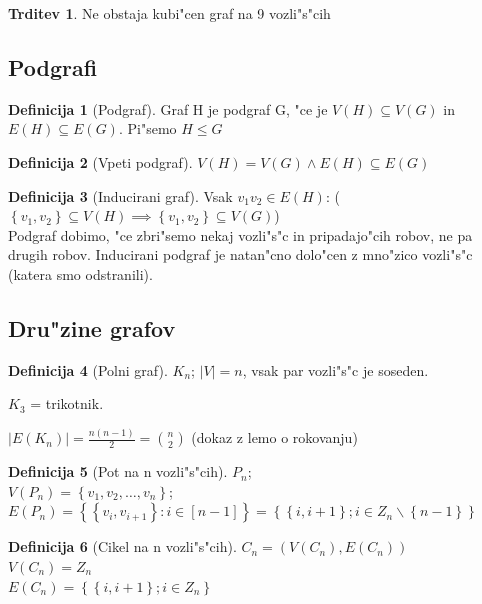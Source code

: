 \documentclass{article}
\theoremstyle{definition}
\newtheorem{definition}{Definicija}[section]
\newtheorem{claim}{Trditev}[section]
\begin{document}
	\begin{claim} 
		Ne obstaja kubi"cen graf na 9 vozli"s"cih
	\end{claim}
	
	
	\subsection{Podgrafi}
	\begin{definition}[Podgraf]
		Graf H je podgraf G, "ce je $V(H) \subseteq V(G)$ in $E(H) \subseteq E(G)$. Pi"semo $H \leq G$
	\end{definition}
	\begin{definition}[Vpeti podgraf]
		$V(H) = V(G) \land E(H) \subseteq E(G)$
	\end{definition}
	\begin{definition}[Inducirani graf]
		Vsak $v_1v_2 \in E(H)$: ($\left\lbrace v_1,v_2\right\rbrace \subseteq V(H) \implies \left\lbrace v_1,v_2\right\rbrace \subseteq V(G)$)
		\\
		Podgraf dobimo, "ce zbri"semo nekaj vozli"s"c in pripadajo"cih robov, ne pa drugih robov.
		Inducirani podgraf je natan"cno dolo"cen z mno"zico vozli"s"c (katera smo odstranili).
	\end{definition}
	
	\subsection{Dru"zine grafov} 
	\begin{definition}[Polni graf]
		$K_n$; $|V| = n$, vsak par vozli"s"c je soseden.
	\end{definition}

	$K_3$ = trikotnik.
	
	$|E(K_n)| = \frac{n(n-1)}{2} = {n \choose 2}$ (dokaz z lemo o rokovanju)
	
	\begin{definition}[Pot na n vozli"s"cih]
		$P_n$;
		\\
		$V(P_n) = \left\lbrace v_1, v_2, \ldots ,v_n \right\rbrace$; 
		\\
		$E(P_n) = \left\lbrace\left\lbrace v_i, v_{i+1} \right\rbrace : i \in [n-1]\right\rbrace = \left\lbrace \left\lbrace i, i+1 \right\rbrace; i \in Z_n \backslash \left\lbrace n-1\right\rbrace\right\rbrace$ \\ 
	\end{definition}
	\begin{definition}[Cikel na n vozli"s"cih]
		$C_n = (V(C_n), E(C_n))$ \\
		$V(C_n) = Z_n$ \\
		$E(C_n) = \left\lbrace\left\lbrace i,i+1\right\rbrace; i \in Z_n\right\rbrace$
	\end{definition}
\end{document}
